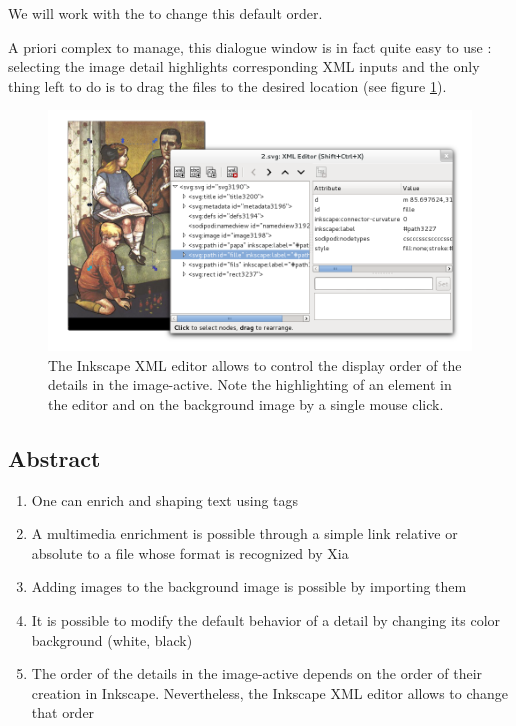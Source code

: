 We will work with the  to change this default order.

A priori complex to manage, this dialogue window is in fact quite easy to use : 
selecting the image detail highlights corresponding XML inputs and the only thing left 
to do is to drag the files to the desired location (see figure \ref{ordre_couches}).

\begin{figure}[htp]
 \centering
 \includegraphics[width=\textwidth]{images/ordre_couches}
 \caption{The Inkscape XML editor allows to control the display order of the details in the image-active. Note the highlighting of an element  
in the editor and on the background image by a single mouse click.}
 \label{ordre_couches}
\end{figure}

\subsection{Abstract}

\begin{enumerate}
 \item One can enrich and shaping text using tags
 \item A multimedia enrichment is possible through a simple link relative
or absolute to a file whose format is recognized by Xia
 \item Adding images to the background image is possible by importing them
 \item It is possible to modify the default behavior of a detail by changing its color 
background (white, black)
 \item The order of the details in the image-active depends on the order
of their creation in Inkscape. Nevertheless, the Inkscape XML editor allows to change that order
\end{enumerate}


